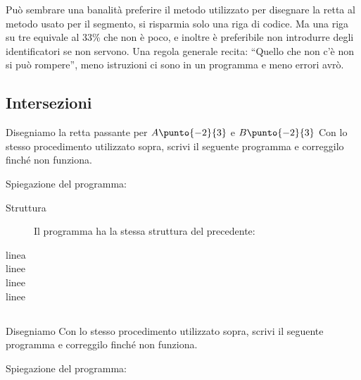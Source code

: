 \begin{osservazione}

 Può sembrare una banalità preferire il metodo utilizzato per disegnare la 
retta al metodo usato per il segmento, si risparmia solo una riga di codice. 
Ma una riga su tre equivale al 33\% che non è poco, e inoltre è 
preferibile non introdurre degli identificatori se non servono. Una regola 
generale recita: ``Quello che non c'è non si può rompere'', meno istruzioni ci 
sono in un programma e meno errori avrò.

\end{osservazione}

\subsection{Intersezioni}
\label{subsec:geo_int_intersezioni}
Disegniamo la retta passante per \(A\punto{-2}{3}\) e \(B\punto{-2}{3}\) 
Con lo stesso procedimento utilizzato sopra, scrivi il seguente programma e 
correggilo finché non funziona.



Spiegazione del programma:

\begin{description}
 \item [Struttura] 
 Il programma ha la stessa struttura del precedente:
 \item [linea ]
 
 \item [linee ]
 
 \item [linee ]
 \item [linee ]
\end{description}

\begin{osservazione}

 

\end{osservazione}

\subsection{}
\label{subsec:geo_int_}
Disegniamo 
Con lo stesso procedimento utilizzato sopra, scrivi il seguente programma e 
correggilo finché non funziona.



Spiegazione del programma:

